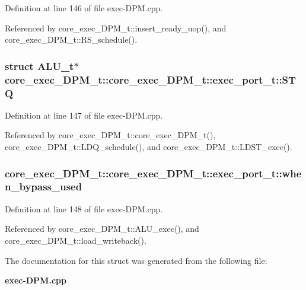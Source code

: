 Definition at line 146 of file exec-DPM.cpp.

Referenced by core\_\-exec\_\-DPM\_\-t::insert\_\-ready\_\-uop(), and core\_\-exec\_\-DPM\_\-t::RS\_\-schedule().
\subsubsection[{STQ}]{\setlength{\rightskip}{0pt plus 5cm}struct {\bf ALU\_\-t}$\ast$ core\_\-exec\_\-DPM\_\-t::core\_\-exec\_\-DPM\_\-t::exec\_\-port\_\-t::STQ\hspace{0.3cm}{\tt  [read]}}\label{structcore__exec__DPM__t_1_1exec__port__t_fc1d32ea7cc73c119f2354b07303027c}




Definition at line 147 of file exec-DPM.cpp.

Referenced by core\_\-exec\_\-DPM\_\-t::core\_\-exec\_\-DPM\_\-t(), core\_\-exec\_\-DPM\_\-t::LDQ\_\-schedule(), and core\_\-exec\_\-DPM\_\-t::LDST\_\-exec().
\subsubsection[{when\_\-bypass\_\-used}]{ core\_\-exec\_\-DPM\_\-t::core\_\-exec\_\-DPM\_\-t::exec\_\-port\_\-t::when\_\-bypass\_\-used}\label{structcore__exec__DPM__t_1_1exec__port__t_7b2f7ee0f5ef4e237188bbbbf6c48459}




Definition at line 148 of file exec-DPM.cpp.

Referenced by core\_\-exec\_\-DPM\_\-t::ALU\_\-exec(), and core\_\-exec\_\-DPM\_\-t::load\_\-writeback().

The documentation for this struct was generated from the following file:\begin{CompactItemize}
\item 
{\bf exec-DPM.cpp}\end{CompactItemize}
